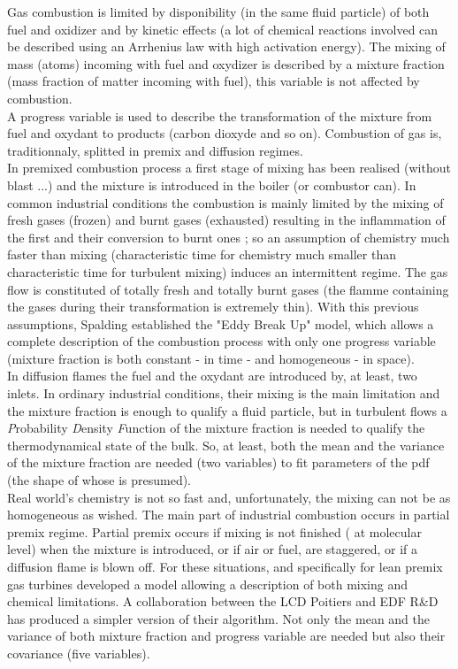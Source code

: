 Gas combustion is limited by disponibility (in the same fluid particle) of both
fuel and oxidizer and by kinetic effects (a lot of chemical reactions involved
can be described using an Arrhenius law with high activation energy). The mixing
of mass (atoms) incoming with fuel and oxydizer is described by a mixture
fraction (mass fraction of matter incoming with fuel), this
variable is not affected by combustion.\\
A progress variable is used to describe the transformation of the mixture from
fuel and oxydant to products (carbon dioxyde and so on).
Combustion of gas is, traditionnaly, splitted in premix and diffusion regimes.\\
In premixed combustion process a first stage of mixing has been realised
(without blast ...) and the mixture is introduced in the boiler (or combustor
can). In common industrial conditions the combustion is mainly limited by the
mixing of fresh gases (frozen) and burnt gases (exhausted) resulting in the
inflammation of the first and their conversion to burnt ones ; so an assumption
of chemistry much faster than mixing (characteristic time for chemistry much
smaller than characteristic time for turbulent mixing) induces an intermittent
regime. The gas flow is constituted of totally fresh and totally burnt gases
(the flamme containing the gases during their transformation is extremely
thin). With this previous assumptions, Spalding \cite{1} established the "Eddy
Break Up" model, which allows a complete description of the combustion process
with only one progress variable (mixture fraction is both constant
- in time - and homogeneous - in space).\\
In diffusion flames the fuel and the oxydant are introduced by, at least, two
inlets. In ordinary industrial conditions, their mixing is the main limitation
and the mixture fraction is enough to qualify a fluid particle, but in turbulent
flows a {\em P}robability {\em D}ensity {\em F}unction of the mixture fraction
is needed to qualify the thermodynamical state of the bulk. So, at least, both
the mean and the variance of the mixture fraction are needed (two variables) to
fit parameters of the pdf (the shape of whose is presumed).\\
Real world's chemistry is not so fast and, unfortunately, the mixing can not be
as homogeneous as wished. The main part of industrial combustion occurs in
partial premix regime. Partial premix occurs if mixing is not finished ( at
molecular level) when the mixture is introduced, or if air or fuel, are
staggered, or if a diffusion flame is blown off. For these situations, and
specifically for lean premix gas turbines \cite{2} developed a model allowing a
description of both mixing and chemical limitations. A collaboration between the
LCD Poitiers \cite{3} and EDF R\&D has produced a simpler version of their
algorithm. Not only the mean and the variance of both mixture fraction and
progress variable are needed but also their covariance (five variables).
 

